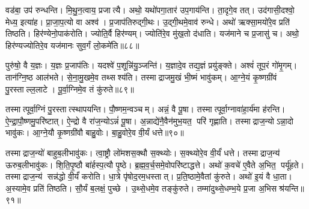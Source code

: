 वड॑बा॒ उप॑ रुन्धन्ति। मि॒थु॒न॒त्वाय॒ प्रजात्यै। अथो॒ यथो॑पगा॒तार॑ उप॒गाय॑न्ति। ता॒दृगे॒व तत्। उद॑गासी॒दश्वो॒ मेध्य॒ इत्या॑ह। प्रा॒जा॒प॒त्यो वा अश्व॑। प्र॒जाप॑तिरुद्गी॒थः। उ॒द्गी॒थमे॒वाव॑ रुन्धे। अथो॑ ऋक्सा॒मयो॑रे॒व प्रति॑ तिष्ठति। हिर॑ण्येनो॒पाक॑रोति। ज्योति॒र्वै हिर॑ण्यम्। ज्योति॑रे॒व मु॑ख॒तो द॑धाति। यज॑माने च प्र॒जासु॑ च। अथो॒ हिर॑ण्यज्योतिरे॒व यज॑मानः सुव॒र्गं लो॒कमे॑ति॥८८॥\anuvakamend[तथ्स उ॒पाक॑रोति च॒त्वारि॑ च]

पुरु॑षो॒ वै य॒ज्ञः। य॒ज्ञः प्र॒जाप॑तिः। यदश्वे॑ प॒शून्नि॑यु॒ञ्जन्ति॑। य॒ज्ञादे॒व तद्य॒ज्ञं प्रयु॑ङ्क्ते। अश्वं॑ तूप॒रं गो॑मृ॒गम्। तान॑ग्नि॒ष्ठ आल॑भते। से॒ना॒मु॒खमे॒व तथ्सश्य॑ति। तस्माद्राजमु॒खं भी॒ष्मं भावु॑कम्। आ॒ग्ने॒यं कृ॒ष्णग्री॑वं पु॒रस्ताल्ल॒लाटे। पू॒र्वा॒ग्निमे॒व तं कु॑रुते॥८९॥

तस्मात्पूर्वा॒ग्निं पु॒रस्तात्स्थापयन्ति। पौ॒ष्णम॒न्वञ्चम्। अन्नं॒ वै पू॒षा। तस्मात्पूर्वा॒ग्नावा॑हा॒र्य॑मा ह॑रन्ति। ऐ॒न्द्रा॒पौ॒ष्णमु॒परि॑ष्टात्। ऐ॒न्द्रो वै रा॑ज॒न्योऽन्नं॑ पू॒षा। अ॒न्नाद्ये॑नै॒वैन॑मुभ॒यत॒ परि॑ गृह्णाति। तस्माद्राज॒न्योऽन्ना॒दो भावु॑कः। आ॒ग्ने॒यौ कृ॒ष्णग्री॑वौ बाहु॒वोः। बा॒हु॒वोरे॒व वी॒र्यं धत्ते॥९०॥

तस्माद्राज॒न्यो॑ बाहुब॒लीभावु॑कः। त्वा॒ष्ट्रौ लो॑मशस॒क्थौ स॒क्थ्योः। स॒क्थ्योरे॒व वी॒र्यं॑ धत्ते। तस्माद्राज॒न्य॑ ऊरुब॒लीभावु॑कः। शि॒ति॒पृ॒ष्ठौ बा॑र्\mbox{}हस्प॒त्यौ पृ॒ष्ठे। ब्र॒ह्म॒व॒र्च॒समे॒वोपरि॑ष्टाद्धत्ते। अथो॑ क॒वचे॑ ए॒वैते अ॒भित॒ पर्यू॑हते। तस्माद्राज॒न्य॑ सन्न॑द्धो वी॒र्यं॑ करोति। धा॒त्रे पृ॑षोद॒रम॒धस्तात्। प्र॒ति॒ष्ठामे॒वैतां कु॑रुते। अथो॑ इ॒यं वै धा॒ता। अ॒स्यामे॒व प्रति॑ तिष्ठति। सौ॒र्यं ब॒लक्षं॒ पुच्छे। उ॒थ्से॒धमे॒व तङ्कु॑रुते। तम्मा॑दुथ्से॒धम्भ॒ये प्र॒जा अ॒भिसश्र॑यन्ति॥९१॥




